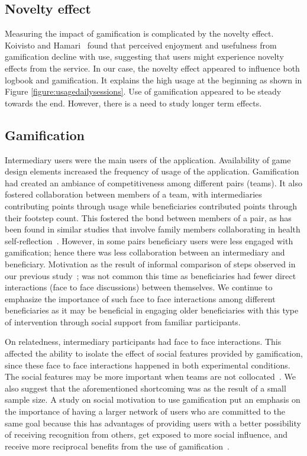 \documentclass{sig-alternate}
\begin{document}
\subsection*{\textbf{Novelty effect}}
Measuring the impact of gamification is complicated by the novelty effect. Koivisto and Hamari~\cite{koivisto2014demographic} found that perceived enjoyment and usefulness from gamification decline with use, suggesting that users might experience novelty effects from the service. In our case, the novelty effect appeared to influence both logbook and gamification. It explains the high usage at the beginning as shown in Figure \ref{figure:usagedailysessions}. Use of gamification appeared to be steady towards the end. However, there is a need to study longer term effects.

\subsection*{\textbf{Gamification}} 
Intermediary users were the main users of the application. Availability of game design elements increased the frequency of usage of the application. Gamification had created an ambiance of competitiveness among different pairs (teams). It also fostered collaboration between members of a team, with intermediaries contributing points through usage while beneficiaries contributed points through their footstep count. This fostered the bond between members of a pair, as has been found in similar studies that involve family members collaborating in health self-reflection~\cite{grimes2009toward,saksono2015spaceship}. However, in some pairs beneficiary users were less engaged with gamification; hence there was less collaboration between an intermediary and beneficiary. Motivation as the result of informal comparison of steps observed in our previous study~\cite{katule2016:leveraging}; was not common this time as beneficiaries had fewer direct interactions (face to face discussions) between themselves. We continue to emphasize the importance of such face to face interactions among different beneficiaries as it may be beneficial in engaging older beneficiaries with this type of intervention through social support from familiar participants.

On relatedness, intermediary participants had face to face interactions. This affected the ability to isolate the effect of social features provided by gamification, since these face to face interactions happened in both experimental conditions. The social features may be more important when teams are not collocated~\cite{lin2006:fish}. We also suggest that the aforementioned shortcoming was as the result of a small sample size. A study on social motivation to use gamification put an emphasis on the importance of having a larger network of users who are committed to the same goal because this has advantages of providing users with a better possibility of receiving recognition from others, get exposed to more social influence, and receive more reciprocal benefits from the use of gamification~\cite{hamari2013social}.
\end{document}
